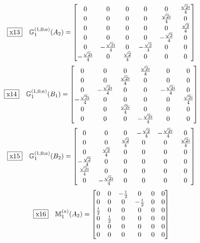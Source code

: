 \documentclass[fleqn,10pt,landscape]{jsarticle}
\begin{document}
\begin{dmath*}
\fbox{x13}\quad \mathbb{G}_{1}^{(1,0;a)}(A_{2})=\begin{bmatrix} 0 & 0 & 0 & 0 & 0 & \frac{\sqrt{2} i}{4} \\ 0 & 0 & 0 & 0 & \frac{\sqrt{2} i}{4} & 0 \\ 0 & 0 & 0 & 0 & 0 & \frac{\sqrt{2}}{4} \\ 0 & 0 & 0 & 0 & - \frac{\sqrt{2}}{4} & 0 \\ 0 & - \frac{\sqrt{2} i}{4} & 0 & - \frac{\sqrt{2}}{4} & 0 & 0 \\ - \frac{\sqrt{2} i}{4} & 0 & \frac{\sqrt{2}}{4} & 0 & 0 & 0 \end{bmatrix}
\end{dmath*}
\begin{dmath*}
\fbox{x14}\quad \mathbb{G}_{1}^{(1,0;a)}(B_{1})=\begin{bmatrix} 0 & 0 & 0 & \frac{\sqrt{2} i}{4} & 0 & 0 \\ 0 & 0 & \frac{\sqrt{2} i}{4} & 0 & 0 & 0 \\ 0 & - \frac{\sqrt{2} i}{4} & 0 & 0 & - \frac{\sqrt{2} i}{4} & 0 \\ - \frac{\sqrt{2} i}{4} & 0 & 0 & 0 & 0 & \frac{\sqrt{2} i}{4} \\ 0 & 0 & \frac{\sqrt{2} i}{4} & 0 & 0 & 0 \\ 0 & 0 & 0 & - \frac{\sqrt{2} i}{4} & 0 & 0 \end{bmatrix}
\end{dmath*}
\begin{dmath*}
\fbox{x15}\quad \mathbb{G}_{1}^{(1,0;a)}(B_{2})=\begin{bmatrix} 0 & 0 & 0 & - \frac{\sqrt{2}}{4} & - \frac{\sqrt{2} i}{4} & 0 \\ 0 & 0 & \frac{\sqrt{2}}{4} & 0 & 0 & \frac{\sqrt{2} i}{4} \\ 0 & \frac{\sqrt{2}}{4} & 0 & 0 & 0 & 0 \\ - \frac{\sqrt{2}}{4} & 0 & 0 & 0 & 0 & 0 \\ \frac{\sqrt{2} i}{4} & 0 & 0 & 0 & 0 & 0 \\ 0 & - \frac{\sqrt{2} i}{4} & 0 & 0 & 0 & 0 \end{bmatrix}
\end{dmath*}
\begin{dmath*}
\fbox{x16}\quad \mathbb{M}_{1}^{(a)}(A_{2})=\begin{bmatrix} 0 & 0 & - \frac{i}{2} & 0 & 0 & 0 \\ 0 & 0 & 0 & - \frac{i}{2} & 0 & 0 \\ \frac{i}{2} & 0 & 0 & 0 & 0 & 0 \\ 0 & \frac{i}{2} & 0 & 0 & 0 & 0 \\ 0 & 0 & 0 & 0 & 0 & 0 \\ 0 & 0 & 0 & 0 & 0 & 0 \end{bmatrix}
\end{dmath*}
\end{document}
